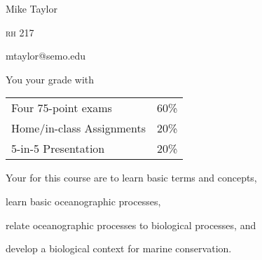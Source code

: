 \documentclass[t]{beamer}
\begin{document}

{
\begin{frame}[t]
\end{frame}
}

{
\begin{frame}[t,plain]
\large
\vspace{5ex}
\hangpara\hspace{17em} Mike Taylor

\hangpara\hspace{17em} \textsc{rh} 217

\hangpara\hspace{17em} mtaylor@semo.edu

\end{frame}
}

\begin{frame}[t]{You  your grade with}
	\begin{center}\large\begin{tabular}{@{}ll@{}}
	Four 75-point exams & 60\% \\
	Home/in-class Assignments & 20\% \\
	5-in-5 Presentation & 20\% \\
	\end{tabular}
	\end{center}
\end{frame}

{
\begin{frame}[t]
\end{frame}
}

\begin{frame}[t]{Your  for this course are to}
	\hangpara learn basic terms and concepts,

	\hangpara learn basic oceanographic processes,
	
	\hangpara relate oceanographic processes to biological processes, and

	\hangpara develop a biological context for marine conservation.
	
	

\end{frame}
\end{document}
